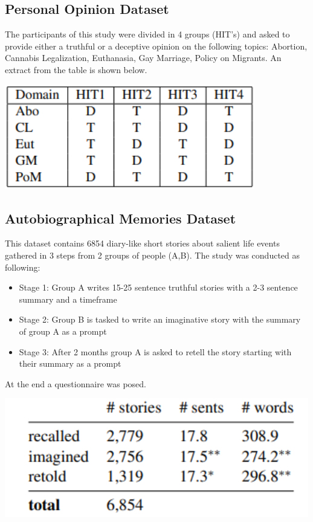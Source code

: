 \documentclass[10pt,twocolumn,letterpaper]{article}
\begin{document}
\subsection{Personal Opinion Dataset}

The participants of this study were divided in 4 groups (HIT’s) and asked to provide either 
a truthful or a deceptive opinion on the following topics: Abortion, Cannabis Legalization, Euthanasia, Gay Marriage, Policy on Migrants.
An extract from the table is shown below. \\

\begin{center}
\includegraphics[scale=0.5]{img/pers_op_dataset.jpg} \\
\end{center}

\subsection{Autobiographical Memories Dataset}

This dataset contains 6854 diary-like short stories about salient life events gathered in 3 steps from 2 groups of people (A,B).
The study was conducted as following:

\begin{itemize}
    \item Stage 1: Group A writes 15-25 sentence truthful stories with a 2-3 sentence summary and a timeframe
    \item Stage 2: Group B is tasked to write an imaginative story with the summary of group A as a prompt
    \item Stage 3: After 2 months group A is asked to retell the story starting with their summary as a prompt
\end{itemize}
At the end a questionnaire was posed. \\

\begin{center}
\includegraphics[scale=0.45]{img/autobio_mem_dataset.jpg} \\
\end{center}
\end{document}
